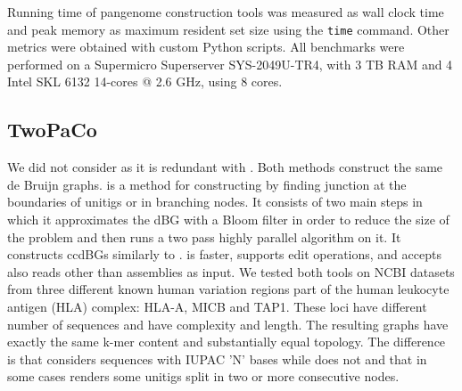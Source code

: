 Running time of pangenome construction tools was measured as wall clock time and peak memory as maximum resident set size using the \texttt{time} command. Other metrics were obtained with custom Python scripts. All benchmarks were performed on a Supermicro Superserver SYS-2049U-TR4, with 3 TB RAM and 4 Intel SKL 6132 14-cores @ 2.6 GHz, using 8 cores. \\

\subsection*{\textbf{TwoPaCo}}
\label{app:twopaco}
We did not consider \twopaco as it is redundant with \bifrost. Both methods construct the same de Bruijn graphs.
\twopaco is a method for constructing \ccdbgs by finding junction \kmers at the boundaries of unitigs or in branching nodes. It consists of two main steps in which it approximates the dBG with a Bloom filter in order to reduce the size of the problem and then runs a two pass highly parallel algorithm on it. It constructs ccdBGs similarly to \bifrost. \bifrost  is faster, supports edit operations, and accepts also reads other than assemblies as input. We tested both tools on NCBI datasets from three different known human variation regions part of the human leukocyte antigen (HLA) complex: HLA-A, MICB and TAP1. These loci have different number of sequences and have complexity and length. The resulting graphs have exactly the same k-mer content and substantially equal topology. The difference is that \twopaco considers sequences with IUPAC 'N' bases while \bifrost does not and that in some cases \twopaco renders some unitigs split in two or more consecutive nodes.

